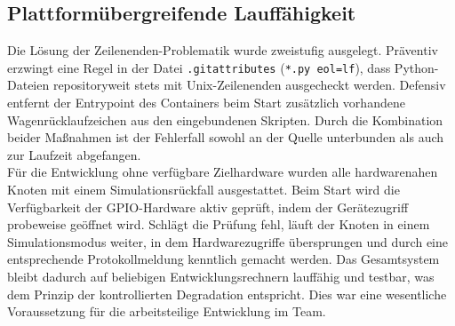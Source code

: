 \subsection{Plattformübergreifende Lauffähigkeit}
\label{sec:plattform_lauffaehigkeit}
Die Lösung der Zeilenenden-Problematik wurde zweistufig ausgelegt. Präventiv erzwingt eine Regel in der Datei \texttt{.gitattributes} (\texttt{*.py eol=lf}), dass Python-Dateien repositoryweit stets mit Unix-Zeilenenden ausgecheckt werden. Defensiv entfernt der Entrypoint des Containers beim Start zusätzlich vorhandene Wagenrücklaufzeichen aus den eingebundenen Skripten. Durch die Kombination beider Maßnahmen ist der Fehlerfall sowohl an der Quelle unterbunden als auch zur Laufzeit abgefangen.
\\
Für die Entwicklung ohne verfügbare Zielhardware wurden alle hardwarenahen Knoten mit einem Simulationsrückfall ausgestattet. Beim Start wird die Verfügbarkeit der GPIO-Hardware aktiv geprüft, indem der Gerätezugriff probeweise geöffnet wird. Schlägt die Prüfung fehl, läuft der Knoten in einem Simulationsmodus weiter, in dem Hardwarezugriffe übersprungen und durch eine entsprechende Protokollmeldung kenntlich gemacht werden. Das Gesamtsystem bleibt dadurch auf beliebigen Entwicklungsrechnern lauffähig und testbar, was dem Prinzip der kontrollierten Degradation entspricht. Dies war eine wesentliche Voraussetzung für die arbeitsteilige Entwicklung im Team.
